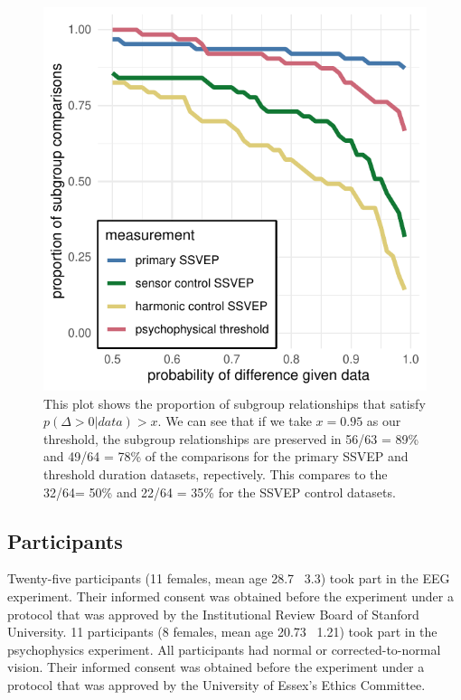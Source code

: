 \documentclass[11pt, twoside]{article}
\begin{document}
\begin{figure}[tbp]
\centering
\includegraphics[width=0.5\linewidth]{../analysis/plots/model_roc_style.pdf}
\caption{This plot shows the proportion of subgroup relationships that satisfy $p(\Delta >0 | data) > x$. We can see that if we take $x = 0.95$ as our threshold, the subgroup relationships are preserved in 56/63 = 89\% and 49/64 = 78\% of the comparisons for the primary SSVEP and threshold duration datasets, repectively. This compares to the 32/64= 50\% and 22/64 = 35\% for the SSVEP control datasets.}
\label{fig:durations_rotations}
\end{figure}

\subsection*{Participants}
Twenty-five participants (11 females, mean age 28.7 \textpm\ 3.3) took part in the EEG experiment. Their informed consent was obtained before the experiment under a protocol that was approved by the Institutional Review Board of Stanford University. 11 participants (8 females, mean age 20.73 \textpm\ 1.21) took part in the psychophysics experiment. All participants had normal or corrected-to-normal vision. Their informed consent was obtained before the experiment under a protocol that was approved by the University of Essex's Ethics Committee.
\end{document}
